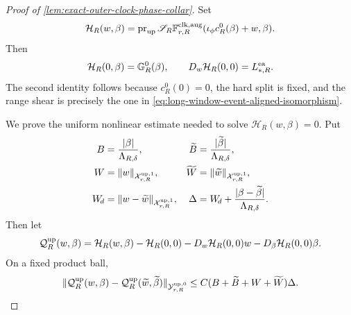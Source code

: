\begin{proof}[Proof of
\cref{lem:exact-outer-clock-phase-collar}]
Set
\begin{equation}
 \mathcal H_R(w,\beta)
 =\operatorname{pr}_{\rm up}\mathscr S_R
 \mathbb F_{r,R}^{\rm clk,aug}
       (\iota_\phi c_R^0(\beta)+w,\beta).        \label{eq:proof-outer-clock-upper-collar-map}
\end{equation}
Then
\[
 \mathcal H_R(0,\beta)=\mathbb G_R^0(\beta),
 \qquad
 D_w\mathcal H_R(0,0)=L_{*,R}^{\rm ea}.
\]
The second identity follows because \(c_R^0(0)=0\), the hard split is
fixed, and the range shear is precisely the one in
\cref{eq:long-window-event-aligned-isomorphism}.

We prove the uniform nonlinear estimate needed to solve
\(\mathcal H_R(w,\beta)=0\).  Put
\begin{align*}
 B&=\frac{|\beta|}{\Lambda_{R,\delta}},&
 \widetilde B&=\frac{|\widetilde\beta|}{\Lambda_{R,\delta}},\\
 W&=\|w\|_{\mathcal X_{r,R}^{\rm up,1}},&
 \widetilde W&=\|\widetilde w\|_{\mathcal X_{r,R}^{\rm up,1}},\\
 W_{\!d}&=\|w-\widetilde w\|_{\mathcal X_{r,R}^{\rm up,1}},&
 \Delta&=W_{\!d}
       +\frac{|\beta-\widetilde\beta|}{\Lambda_{R,\delta}}.
\end{align*}
Then let
\[
 \mathcal Q_R^{\rm up}(w,\beta)
 =\mathcal H_R(w,\beta)-\mathcal H_R(0,0)
      -D_w\mathcal H_R(0,0)w-D_\beta\mathcal H_R(0,0)\beta.
\]
On a fixed product ball,
\begin{equation}
 \|\mathcal Q_R^{\rm up}(w,\beta)
       -\mathcal Q_R^{\rm up}(\widetilde w,\widetilde\beta)\|_
          {\mathcal Y_{r,R}^{\rm up,0}}
 \le C(B+\widetilde B+W+\widetilde W)\Delta.     \label{eq:proof-outer-clock-upper-two-point}
\end{equation}


\end{proof}
